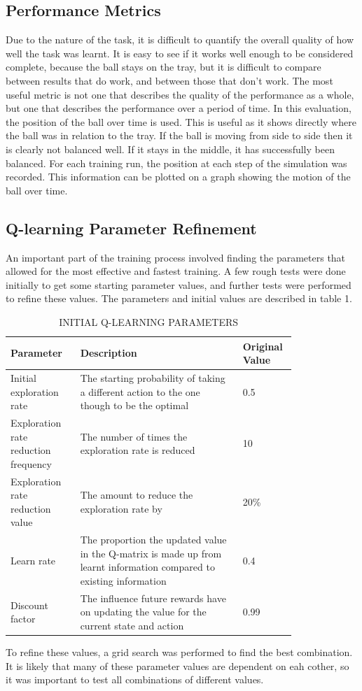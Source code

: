 \documentclass[12pt,a4paper]{article}
\begin{document}
\subsection{Performance Metrics}
Due to the nature of the task, it is difficult to quantify the overall quality of how well the task was learnt. It is easy to see if it works well enough to be considered complete, because the ball stays on the tray, but it is difficult to compare between results that do work, and between those that don't work. The most useful metric is not one that describes the quality of the performance as a whole, but one that describes the performance over a period of time. In this evaluation, the position of the ball over time is used. This is useful as it shows directly where the ball was in relation to the tray. If the ball is moving from side to side then it is clearly not balanced well. If it stays in the middle, it has successfully been balanced. For each training run, the position at each step of the simulation was recorded. This information can be plotted on a graph showing the motion of the ball over time. 

\subsection{Q-learning Parameter Refinement}
An important part of the training process involved finding the parameters that allowed for the most effective and fastest training. A few rough tests were done initially to get some starting parameter values, and further tests were performed to refine these values. The parameters and initial values are described in table 1.
\begin{table}[htb]
\centering
\caption{INITIAL Q-LEARNING PARAMETERS}
\vspace*{6pt}
\label{q_params}
\begin{tabular}{>{\raggedright}p{0.21\linewidth}p{0.5\linewidth}p{0.1\linewidth}}\hline
Parameter & Description& Original Value\\ \hline\hline
Initial exploration rate & The starting probability of taking a different action to the one though to be the optimal & 0.5\\ \hline
Exploration rate reduction frequency & The number of times the exploration rate is reduced & 10\\ \hline
Exploration rate reduction value & The amount to reduce the exploration rate by & 20\% \\\hline
Learn rate & The proportion the updated value in the Q-matrix is made up from learnt information compared to existing information & 0.4 \\\hline
Discount factor & The influence future rewards have on updating the value for the current state and action & 0.99 \\\hline
\end{tabular}
\end{table}
To refine these values, a grid search was performed to find the best combination. It is likely that many of these parameter values are dependent on eah cother, so it was important to test all combinations of different values.
\end{document}
